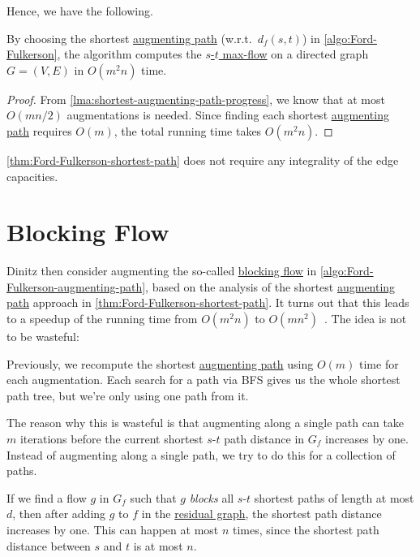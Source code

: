 Hence, we have the following.

\begin{theorem}\label{thm:Ford-Fulkerson-shortest-path}
	By choosing the shortest \hyperref[def:augmenting-path]{augmenting path} (w.r.t.\ \(d_f(s, t)\)) in \autoref{algo:Ford-Fulkerson}, the algorithm computes the \hyperref[prb:s-t-max-flow]{\(s\)-\(t\) max-flow} on a directed graph \(G = (V, E)\) in \(O(m^2 n)\) time.
\end{theorem}
\begin{proof}
	From \autoref{lma:shortest-augmenting-path-progress}, we know that at most \(O(mn / 2)\) augmentations is needed. Since finding each shortest \hyperref[def:augmenting-path]{augmenting path} requires \(O(m)\), the total running time takes \(O(m^2 n)\).
\end{proof}

\begin{remark}
	\autoref{thm:Ford-Fulkerson-shortest-path} does not require any integrality of the edge capacities.
\end{remark}

\section{Blocking Flow}
Dinitz then consider augmenting the so-called \hyperref[def:blocking-flow]{blocking flow} in \autoref{algo:Ford-Fulkerson-augmenting-path}, based on the analysis of the shortest \hyperref[def:augmenting-path]{augmenting path} approach in \autoref{thm:Ford-Fulkerson-shortest-path}. It turns out that this leads to a speedup of the running time from \(O(m^2 n)\) to \(O(mn^2)\)~\cite{karzanov1973finding,dinic1970algorithm,goldberg1998beyond}. The idea is not to be wasteful:

\begin{prev}
	Previously, we recompute the shortest \hyperref[def:augmenting-path]{augmenting path} using \(O(m)\) time for each augmentation. Each search for a path via BFS gives us the whole shortest path tree, but we're only using one path from it.
\end{prev}

The reason why this is wasteful is that augmenting along a single path can take \(m\) iterations before the current shortest \(s\)-\(t\) path distance in \(G_f\) increases by one. Instead of augmenting along a single path, we try to do this for a collection of paths.

\begin{intuition}
	If we find a flow \(g\) in \(G_f\) such that \(g\) \emph{blocks} all \(s\)-\(t\) shortest paths of length at most \(d\), then after adding \(g\) to \(f\) in the \hyperref[def:residual-graph]{residual graph}, the shortest path distance increases by one. This can happen at most \(n\) times, since the shortest path distance between \(s\) and \(t\) is at most \(n\).
\end{intuition}

